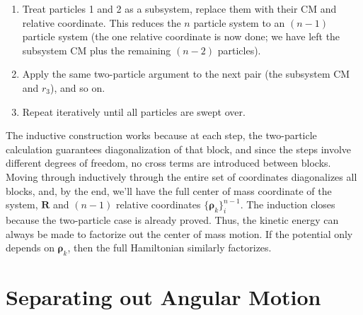 \begin{enumerate}
    \item Treat particles 1 and 2 as a subsystem, replace them with their CM and relative coordinate. This reduces the $n$ particle system to an $(n-1)$ particle system (the one relative coordinate is now done; we have left the subsystem CM plus the remaining $(n-2)$ particles).
    \item Apply the same two-particle argument to the next pair (the subsystem CM and $r_3$), and so on.
    \item Repeat iteratively until all particles are swept over.
\end{enumerate}
The inductive construction works because at each step, the two-particle calculation guarantees diagonalization of that block, and since the steps involve different degrees of freedom, no cross terms are introduced between blocks. Moving through inductively through the entire set of coordinates diagonalizes all blocks, and, by the end, we'll have the full center of mass coordinate of the system, $\mathbf{R}$ and $(n-1)$ relative coordinates $\{\mathbf{\rho}_k\}_i^{n-1}$. The induction closes because the two-particle case is already proved. Thus, the kinetic energy can always be made to factorize out the center of mass motion. If the potential only depends on $\mathbf{\rho}_k$, then the full Hamiltonian similarly factorizes.


\section{Separating out Angular Motion}
